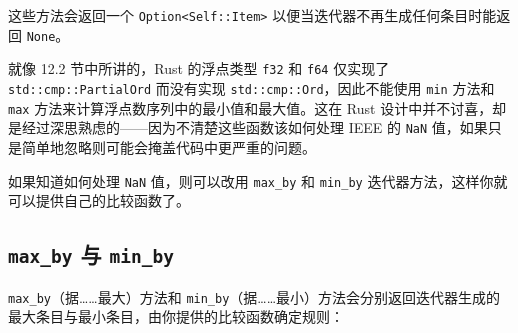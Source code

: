 这些方法会返回一个 \texttt{Option<Self::Item>} 以便当迭代器不再生成任何条目时能返回 \texttt{None}。

就像 12.2 节中所讲的，Rust 的浮点类型 \texttt{f32} 和 \texttt{f64} 仅实现了 \texttt{std::cmp::PartialOrd} 而没有实现 \texttt{std::cmp::Ord}，因此不能使用 \texttt{min} 方法和 \texttt{max} 方法来计算浮点数序列中的最小值和最大值。这在 Rust 设计中并不讨喜，却是经过深思熟虑的——因为不清楚这些函数该如何处理 IEEE 的 \texttt{NaN} 值，如果只是简单地忽略则可能会掩盖代码中更严重的问题。

如果知道如何处理 \texttt{NaN} 值，则可以改用 \texttt{max\_by} 和 \texttt{min\_by} 迭代器方法，这样你就可以提供自己的比较函数了。

\subsection{\texttt{max\_by} 与 \texttt{min\_by}}

\texttt{max\_by}（据……最大）方法和 \texttt{min\_by}（据……最小）方法会分别返回迭代器生成的最大条目与最小条目，由你提供的比较函数确定规则：

